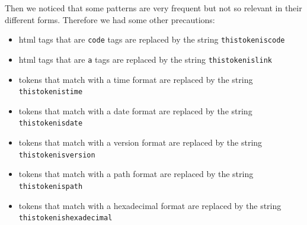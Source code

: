 \documentclass[10pt,twocolumn,letterpaper]{article}
\begin{document}
Then we noticed that some patterns are very frequent but not so relevant in their different forms. Therefore we had some other precautions:
\begin{itemize}
	\item html tags that are \texttt{code} tags are replaced by the string \texttt{thistokeniscode}
	\item html tags that are \texttt{a} tags are replaced by the string \texttt{thistokenislink}
	\item tokens that match with a time format are replaced by the string \texttt{thistokenistime}
	\item tokens that match with a date format are replaced by the string \texttt{thistokenisdate}
	\item tokens that match with a version format are replaced by the string \texttt{thistokenisversion}
	\item tokens that match with a path format are replaced by the string \texttt{thistokenispath}
	\item tokens that match with a hexadecimal format are replaced by the string \texttt{thistokenishexadecimal}
 \end{itemize}
 
\end{document}
